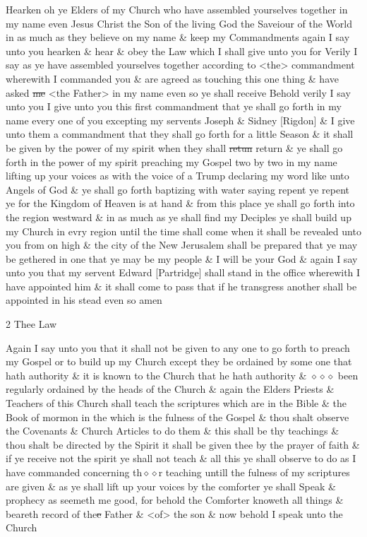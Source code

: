 				Hearken oh ye Elders of my Church who have assembled yourselves together in my name even Jesus Christ the Son of the living God the Saveiour of the World in as much as they believe on my name \& keep my Commandments again I say unto you hearken \& hear \& obey the Law which I shall give unto you for Verily I say as ye have assembled yourselves together according to <the> commandment wherewith I commanded you \& are agreed as touching this one thing \& have asked \sout{me} <the Father> in my name even so ye shall receive Behold verily I say unto you I give unto you this first commandment that ye shall go forth in my name every one of you excepting my servents Joseph \& Sidney [Rigdon] \& I give unto them a commandment that they shall go forth for a little Season \& it shall be given by the power of my spirit when they shall \sout{retun} return \& ye shall go forth in the power of my spirit preaching my Gospel two by two in my name lifting up your voices as with the voice of a Trump declaring my word like unto Angels of God \& ye shall go forth baptizing with water saying repent ye repent ye for the Kingdom of Heaven is at hand \& from this place ye shall go forth into the region westward \& in as much as ye shall find my Deciples ye shall build up my Church in evry region until the time shall come when it shall be revealed unto you from on high \& the city of the New Jerusalem shall be prepared that ye may be gethered in one that ye may be my people \& I will be your God \& again I say unto you that my servent Edward [Partridge] shall stand in the office wherewith I have appointed him \& it shall come to pass that if he transgress another shall be appointed in his stead even so amen

				2 Thee Law

				Again I say unto you that it shall not be given to any one to go forth to preach my Gospel or to build up my Church except they be ordained by some one that hath authority \& it is known to the Church that he hath authority \& $\diamond\diamond\diamond$ been regularly ordained by the heads of the Church \& again the Elders Priests \& Teachers of this Church shall teach the scriptures which are in the Bible \& the Book of mormon in the which is the fulness of the Gospel \& thou shalt observe the Covenants \& Church Articles to do them \& this shall be thy teachings \& thou shalt be directed by the Spirit it shall be given thee by the prayer of faith \& if ye receive not the spirit ye shall not teach \& all this ye shall observe to do as I have commanded concerning th$\diamond\diamond$r teaching untill the fulness of my scriptures are given \& as ye shall lift up your voices by the comforter ye shall Speak \& prophecy as seemeth me good, for behold the Comforter knoweth all things \& beareth record of the\sout{e} Father \& <of> the son \& now behold I speak unto the Church

